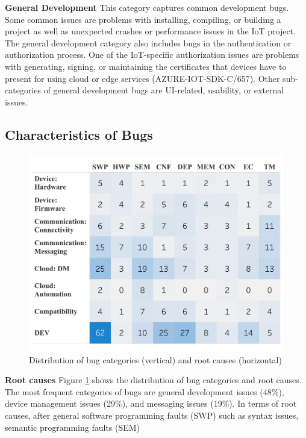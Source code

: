 \textbf{General Development}
This category captures common development bugs. Some common issues are problems with installing, compiling, or building a project as well as unexpected crashes or performance issues in the IoT project. The general development category also includes bugs in the authentication or authorization process. One of the IoT-specific authorization issues are problems with generating, signing, or maintaining the certificates that devices have to present for using cloud or edge services (AZURE-IOT-SDK-C/657). Other sub-categories of general development bugs are UI-related, usability, or external issues.

\subsection{Characteristics of Bugs}

 \begin{figure}[h]
  \centering
   \includegraphics[width=\linewidth]{imgs/rcvis.pdf}
  \caption{Distribution of bug categories (vertical) and root causes (horizontal)}
  \label{fig:bugRC2d}
\end{figure}

\textbf{Root causes}
Figure \ref{fig:bugRC2d} shows the distribution of bug categories and root causes. The most frequent categories of bugs are general development issues (48\%), device management issues (29\%), and messaging issues (19\%). In terms of root causes, after general software programming faults (SWP) such as syntax issues, semantic programming faults (SEM)

